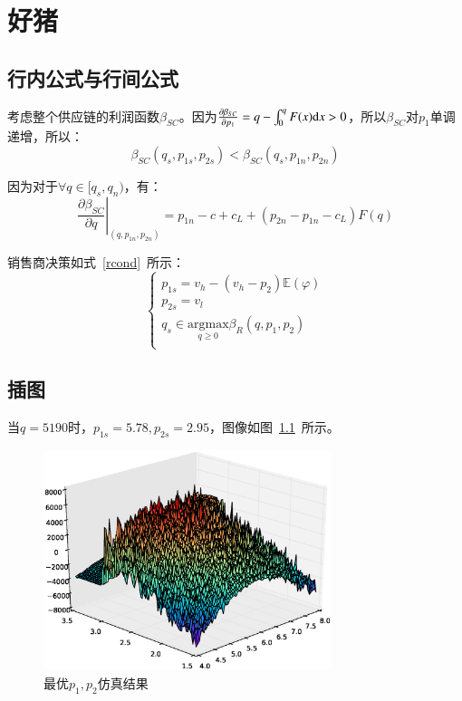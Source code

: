 \chapter{好猪}

\section{行内公式与行间公式}

考虑整个供应链的利润函数$\beta_{SC}$。因为$\frac{\partial\beta_{SC}}{\partial p_1}=q-\int_0^q F(x)\mathrm{d} x>0$，所以$\beta_{SC}$对$p_1$单调递增，所以：
\begin{equation}
\label{dscNoStgProof0}
\beta_{SC}(q_s,p_{1s},p_{2s})<\beta_{SC}(q_s,p_{1n},p_{2n})
\end{equation}

因为对于$\forall q\in[q_s, q_n)$，有：
\[ \left.\frac{\partial \beta_{SC}}{\partial q}\right|_{(q,p_{1n},p_{2n})}=p_{1n}-c+c_L+(p_{2n}-p_{1n}-c_L)F(q) \]

销售商决策如式~\eqref{rcond}~所示：
\begin{equation}
\label{rcond}
\left\{\begin{array}{l}
p_{1s}=v_h-(v_h-p_2)\mathbb{E}(\varphi) \\
p_{2s}=v_l \\
q_s \in \underset{q \geq 0}{\mathrm{argmax}} \beta_R (q, p_1, p_2) \\
\end{array}\right.
\end{equation}

\section{插图}

当$q=5190$时，$p_{1s}=5.78,p_{2s}=2.95$，图像如图~\ref{fig:simuP1P2Result}~所示。
\begin{figure}[htbp!]
\centering
\includegraphics[width=0.75\textwidth]{figures/p1p2figure.eps}
\caption{最优$p_1, p_2$仿真结果}\label{fig:simuP1P2Result}
\vspace{-1em}
\end{figure}

